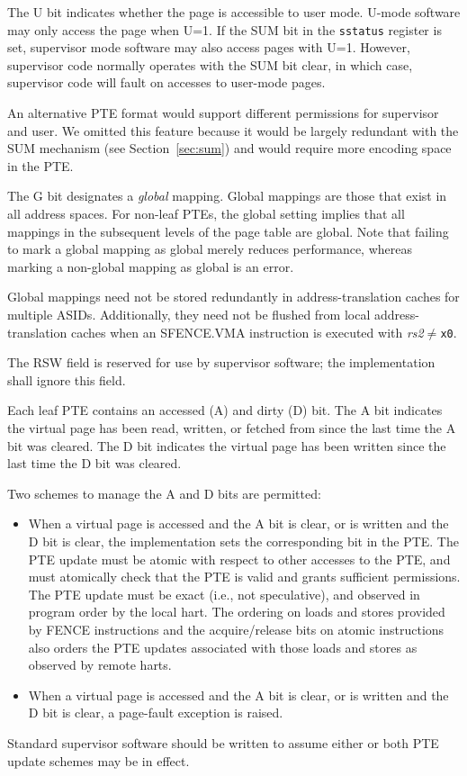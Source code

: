 The U bit indicates whether the page is accessible to user mode.
U-mode software may only access the page when U=1.  If the SUM bit
in the {\tt sstatus} register is
set, supervisor mode software may also access pages with U=1.
However, supervisor code normally operates with the SUM bit clear, in
which case, supervisor code will fault on accesses to user-mode pages.

\begin{commentary}
An alternative PTE format would support different permissions for supervisor
and user.  We omitted this feature because it would be largely redundant with
the SUM mechanism (see Section~\ref{sec:sum}) and would require more encoding
space in the PTE.
\end{commentary}

The G bit designates a {\em global} mapping.  Global mappings are those that
exist in all address spaces.  For non-leaf PTEs, the global setting implies
that all mappings in the subsequent levels of the page table are global.  Note
that failing to mark a global mapping as global merely reduces performance,
whereas marking a non-global mapping as global is an error.

\begin{commentary}
Global mappings need not be stored redundantly in address-translation caches
for multiple ASIDs.  Additionally, they need not be flushed from local
address-translation caches when an SFENCE.VMA instruction is executed with
{\em rs2}$\neq${\tt x0}.
\end{commentary}

The RSW field is reserved for use by supervisor software; the implementation
shall ignore this field.

Each leaf PTE contains an accessed (A) and dirty (D) bit.  The A bit indicates
the virtual page has been read, written, or fetched from since the last time
the A bit was cleared.  The D bit indicates the virtual page has been written
since the last time the D bit was cleared.

Two schemes to manage the A and D bits are permitted:
\begin{itemize}
\item When a virtual page is accessed and the A bit is clear, or is
      written and the D bit is clear, the implementation sets the
      corresponding bit in the PTE.  The PTE update must be atomic with
      respect to other accesses to the PTE, and must atomically check
      that the PTE is valid and grants sufficient permissions.  The
      PTE update must be exact (i.e., not speculative), and observed
      in program order by the local hart. The ordering on loads and stores
      provided by FENCE instructions and the acquire/release bits on atomic
      instructions also orders the PTE updates associated with those loads
      and stores as observed by remote harts.
\item When a virtual page is accessed and the A bit is clear, or is
      written and the D bit is clear, a page-fault exception is raised.
\end{itemize}
Standard supervisor software should be written to assume either or both
PTE update schemes may be in effect.

